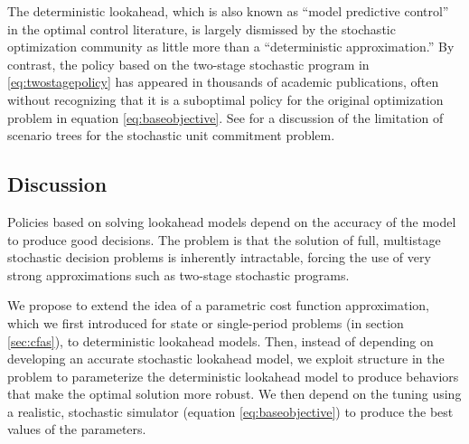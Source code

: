 \documentclass[11pt,oneside,fleqn,reqno,titlepage]{article}
\begin{document}
The deterministic lookahead, which is also known as ``model predictive control'' in the optimal control literature, is largely dismissed by the stochastic optimization community as little more than a ``deterministic approximation.''  By contrast, the policy based on the two-stage stochastic program in \eqref{eq:twostagepolicy} has appeared in thousands of academic publications, often without recognizing that it is a suboptimal policy for the original optimization problem in equation \eqref{eq:baseobjective}.  See \cite{PowellUnitComm2019} for a discussion of the limitation of scenario trees for the stochastic unit commitment problem.

\subsection{Discussion}
Policies based on solving lookahead models depend on the accuracy of the model to produce good decisions.  The problem is that the solution of full, multistage stochastic decision problems is inherently intractable, forcing the use of very strong approximations such as two-stage stochastic programs.

We propose to extend the idea of a parametric cost function approximation, which we first introduced for state or single-period problems (in section \ref{sec:cfas}), to deterministic lookahead models.  Then, instead of depending on developing an accurate stochastic lookahead model, we exploit structure in the problem to parameterize the deterministic lookahead model to produce behaviors that make the optimal solution more robust.  We then depend on the tuning using a realistic, stochastic simulator (equation \eqref{eq:baseobjective}) to produce the best values of the parameters.
\end{document}
